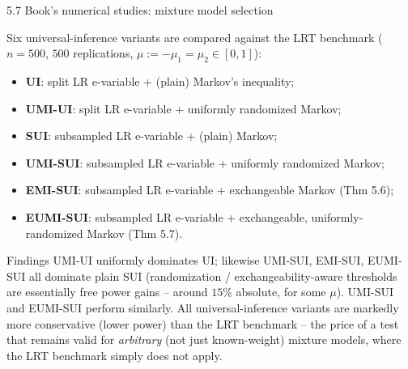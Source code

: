 \documentclass[aspectratio=169,10pt]{beamer}
\begin{document}
\begin{frame}{5.7 Book's numerical studies: mixture model selection}

  Six universal-inference variants are compared against the LRT
  benchmark ($n=500$, $500$ replications, $\mu:=-\mu_1=\mu_2 \in [0,1]$):

  \begin{itemize}
    \item \textbf{UI}: split LR e-variable + (plain) Markov's inequality;
    \item \textbf{UMI-UI}: split LR e-variable + uniformly randomized Markov;
    \item \textbf{SUI}: subsampled LR e-variable + (plain) Markov;
    \item \textbf{UMI-SUI}: subsampled LR e-variable + uniformly randomized Markov;
    \item \textbf{EMI-SUI}: subsampled LR e-variable + exchangeable Markov (Thm 5.6);
    \item \textbf{EUMI-SUI}: subsampled LR e-variable + exchangeable, uniformly-randomized Markov (Thm 5.7).
  \end{itemize}

  \begin{block}{Findings}
    UMI-UI uniformly dominates UI; likewise UMI-SUI, EMI-SUI, EUMI-SUI
    all dominate plain SUI (randomization / exchangeability-aware
    thresholds are essentially free power gains -- around $15\%$
    absolute, for some $\mu$). UMI-SUI and EUMI-SUI perform similarly.
    All universal-inference variants are markedly more conservative
    (lower power) than the LRT benchmark -- the price of a test that
    remains valid for \emph{arbitrary} (not just known-weight) mixture
    models, where the LRT benchmark simply does not apply.
  \end{block}

\end{frame}
\end{document}
